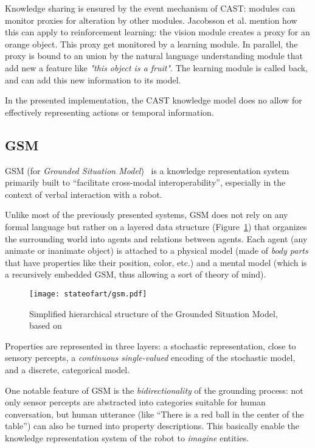 Knowledge sharing is ensured by the event mechanism of CAST: modules can
monitor proxies for alteration by other modules. Jacobsson et al. mention how
this can apply to reinforcement learning: the vision module creates a proxy for
an orange object. This proxy get monitored by a learning module. In parallel,
the proxy is bound to an union by the natural language understanding module
that add new a feature like \emph{"this object is a fruit"}. The learning
module is called back, and can add this new information to its model.

In the presented implementation, the CAST knowledge model does no allow for
effectively representing actions or temporal information.

\subsection{GSM}
\label{sect|gsm}

GSM (for \emph{Grounded Situation Model})~\cite{Mavridis2006} is a knowledge
representation system primarily built to ``facilitate cross-modal
interoperability'',  especially in the context of verbal interaction with a
robot.

Unlike most of the previously presented systems, GSM does not rely on any
formal language but rather on a layered data structure (Figure~\ref{fig|gsm})
that organizes the surrounding world into agents and relations between agents.
Each agent (any animate or inanimate object) is attached to a physical model (made
of \emph{body parts} that have properties like their position, color, etc.) and
a mental model (which is a recursively embedded GSM, thus allowing a sort of
theory of mind).

\begin{figure}
    \centering
    \texttt{[image: stateofart/gsm.pdf]}

    \caption{Simplified hierarchical structure of the Grounded Situation Model,
    based on~\cite{Mavridis2006}}

    \label{fig|gsm}
\end{figure}

Properties are represented in three layers: a stochastic representation, close
to sensory percepts, a \emph{continuous single-valued} encoding of the
stochastic model, and a discrete, categorical model.

One notable feature of GSM is the \emph{bidirectionality} of the grounding
process: not only sensor percepts are abstracted into categories suitable for
human conversation, but human utterance (like ``There is a red ball in the
center of the table'') can also be turned into property descriptions. This
basically enable the knowledge representation system of the robot to
\emph{imagine} entities.

